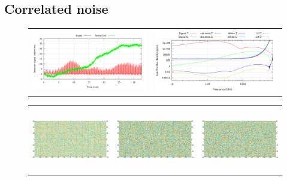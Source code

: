 \documentclass{article}
\begin{document}
\subsection{Correlated noise}
\begin{figure}
	\centering
	\hspace*{-13mm}\begin{tabular}{m{80mm}m{80mm}}
		\vspace*{2.0mm}\includegraphics[width=87mm]{plots/noise_oof_example.pdf} &
			\includegraphics[width=94mm]{plots/noise_abs_log_log_wide.pdf}
	\end{tabular}
	\hspace*{-5mm}\begin{tabular}{m{56mm}m{54.4mm}m{56mm}}
		\includegraphics[height=28mm,clip,trim=0 8mm 7.5mm 0]{plots/noise_oof_sb_map_0.png} &
		\includegraphics[height=28mm,clip,trim=7.5mm 8mm 7.5mm 0]{plots/noise_oof_sb_map_1.png} &
		\includegraphics[height=28mm,clip,trim=7.5mm 8mm 0 0]{plots/noise_oof_sb_map_2.png} \\

\end{tabular}
\end{figure}
\end{document}
